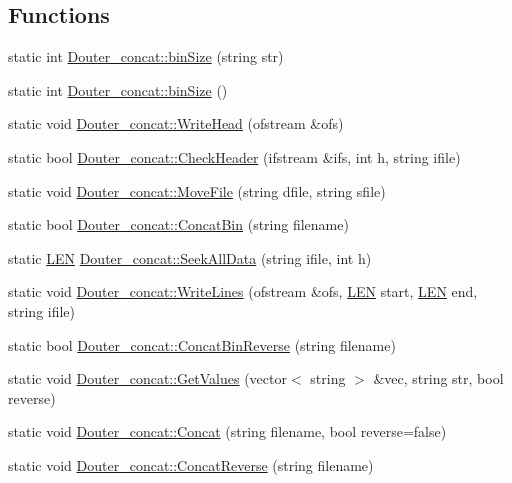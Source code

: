 \subsection*{Functions}
\begin{DoxyCompactItemize}
\item 
static int \hyperlink{namespace_douter__concat_ad5a88da78fc32f038112942cc050229a}{Douter\+\_\+concat\+::bin\+Size} (string str)
\item 
static int \hyperlink{namespace_douter__concat_a9285724679e63cb19699979337517a81}{Douter\+\_\+concat\+::bin\+Size} ()
\item 
static void \hyperlink{namespace_douter__concat_a4d11def509a5faec6eee9dc701bf7162}{Douter\+\_\+concat\+::\+Write\+Head} (ofstream \&ofs)
\item 
static bool \hyperlink{namespace_douter__concat_a8193758a199f8c1b2dbaab322243d939}{Douter\+\_\+concat\+::\+Check\+Header} (ifstream \&ifs, int h, string ifile)
\item 
static void \hyperlink{namespace_douter__concat_a489b9b4145e9325aef23c587c29e939d}{Douter\+\_\+concat\+::\+Move\+File} (string dfile, string sfile)
\item 
static bool \hyperlink{namespace_douter__concat_a893fb2379796ffd3bb05818f0ef9ebf6}{Douter\+\_\+concat\+::\+Concat\+Bin} (string filename)
\item 
static \hyperlink{energy__const_8hh_a05b49c662c073f89e86804f7856622a0}{L\+E\+N} \hyperlink{namespace_douter__concat_a813d0a9403cf1fbf7d90b9a92cf9987f}{Douter\+\_\+concat\+::\+Seek\+All\+Data} (string ifile, int h)
\item 
static void \hyperlink{namespace_douter__concat_ab823d0a82704dee70f3136abf7b80d49}{Douter\+\_\+concat\+::\+Write\+Lines} (ofstream \&ofs, \hyperlink{energy__const_8hh_a05b49c662c073f89e86804f7856622a0}{L\+E\+N} start, \hyperlink{energy__const_8hh_a05b49c662c073f89e86804f7856622a0}{L\+E\+N} end, string ifile)
\item 
static bool \hyperlink{namespace_douter__concat_adcc0d9bde56ec5d6d73bd33f200b3f99}{Douter\+\_\+concat\+::\+Concat\+Bin\+Reverse} (string filename)
\item 
static void \hyperlink{namespace_douter__concat_ab7c6a14da8d315c92d6b73d7bbb42eab}{Douter\+\_\+concat\+::\+Get\+Values} (vector$<$ string $>$ \&vec, string str, bool reverse)
\item 
static void \hyperlink{namespace_douter__concat_a263bd0f94dd48039d12ca670533b5709}{Douter\+\_\+concat\+::\+Concat} (string filename, bool reverse=false)
\item 
static void \hyperlink{namespace_douter__concat_a9d79d3e99a422f02d168f74c29522af2}{Douter\+\_\+concat\+::\+Concat\+Reverse} (string filename)
\end{DoxyCompactItemize}


